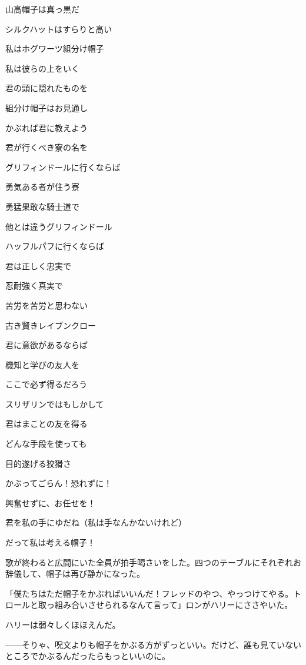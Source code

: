 \documentclass[10pt,a4paper]{article}
\begin{document}
\begin{CJK}{UTF8}{min}
山高帽子は真っ黒だ

シルクハットはすらりと高い

私はホグワーツ組分け帽子

私は彼らの上をいく

君の頭に隠れたものを

組分け帽子はお見通し

かぶれば君に教えよう

君が行くべき寮の名を



グリフィンドールに行くならば

勇気ある者が住う寮

勇猛果敢な騎士道で

他とは違うグリフィンドール



ハッフルパフに行くならば

君は正しく忠実で

忍耐強く真実で

苦労を苦労と思わない



古き賢きレイブンクロー

君に意欲があるならば

機知と学びの友人を

ここで必ず得るだろう



スリザリンではもしかして

君はまことの友を得る

どんな手段を使っても

目的遂げる狡猾さ



かぶってごらん！恐れずに！

興奮せずに、お任せを！

君を私の手にゆだね（私は手なんかないけれど）

だって私は考える帽子！





歌が終わると広間にいた全員が拍手喝さいをした。四つのテーブルにそれぞれお辞儀して、帽子は再び静かになった。

「僕たちはただ帽子をかぶればいいんだ！フレッドのやつ、やっつけてやる。トロールと取っ組み合いさせられるなんて言って」ロンがハリーにささやいた。

ハリーは弱々しくほほえんだ。

――そりゃ、呪文よりも帽子をかぶる方がずっといい。だけど、誰も見ていないところでかぶるんだったらもっといいのに。


\end{CJK}
\end{document}
